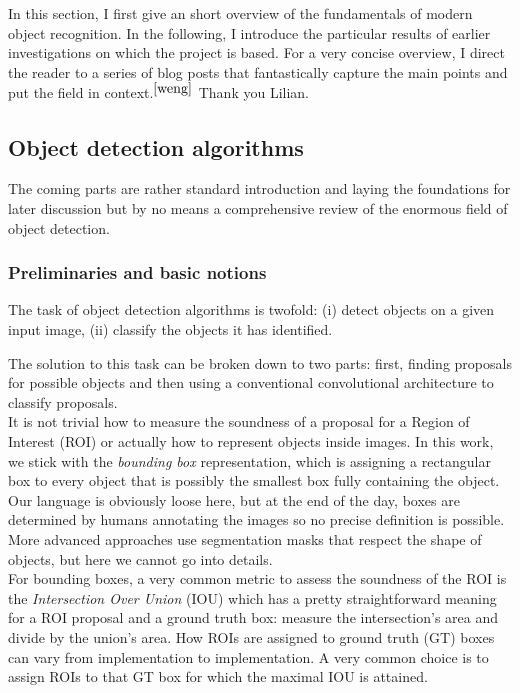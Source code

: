 \documentclass{article}
\begin{document}
In this section, I first give an short overview of the fundamentals of modern object recognition. In the following, I introduce the particular results of earlier investigations on which the project is based. For a very concise overview, I direct the reader to a series of blog posts that fantastically capture the main points and put the field in context.$^{\cite{weng}}$ Thank you Lilian.  

\subsection{Object detection algorithms}

The coming parts are rather standard introduction and laying the foundations for later discussion but by no means a comprehensive review of the enormous field of object detection.

\subsubsection{Preliminaries and basic notions}

The task of object detection algorithms is twofold: (i) detect objects on a given input image, (ii) classify the objects it has identified.

The solution to this task can be broken down to two parts: first, finding proposals for possible objects and then using a conventional convolutional architecture to classify proposals.\\

It is not trivial how to measure the soundness of a proposal for a Region of Interest (ROI) or actually how to represent objects inside images. In this work, we stick with the \textit{bounding box} representation, which is assigning a rectangular box to every object that is possibly the smallest box fully containing the object. Our language is obviously loose here, but at the end of the day, boxes are determined by humans annotating the images so no precise definition is possible. More advanced approaches use segmentation masks that respect the shape of objects, but here we cannot go into details.\\

For bounding boxes, a very common metric to assess the soundness of the ROI is the \textit{Intersection Over Union} (IOU) which has a pretty straightforward meaning for a ROI proposal and a ground truth box: measure the intersection's area and divide by the union's area. How ROIs are assigned to ground truth (GT) boxes can vary from implementation to implementation. A very common choice is to assign ROIs to that GT box for which the maximal IOU is attained.\\
\end{document}
